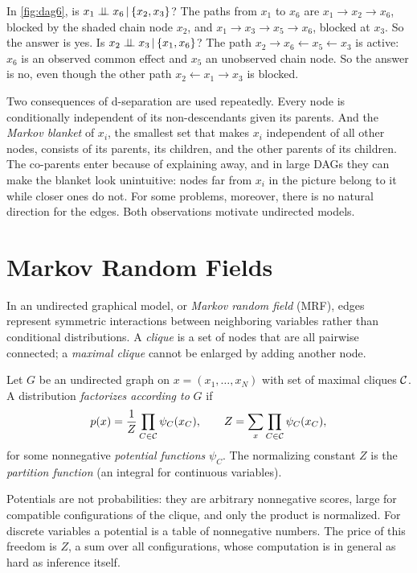 In \cref{fig:dag6}, is $x_1\perp\!\!\!\perp x_6\,|\,\{x_2,x_3\}$? The paths from $x_1$ to $x_6$ are $x_1\to x_2\to x_6$, blocked by the shaded chain node $x_2$, and $x_1\to x_3\to x_5\to x_6$, blocked at $x_3$. So the answer is yes. Is $x_2\perp\!\!\!\perp x_3\,|\,\{x_1,x_6\}$? The path $x_2\to x_6\leftarrow x_5\leftarrow x_3$ is active: $x_6$ is an observed common effect and $x_5$ an unobserved chain node. So the answer is no, even though the other path $x_2\leftarrow x_1\to x_3$ is blocked.

Two consequences of d-separation are used repeatedly. Every node is conditionally independent of its non-descendants given its parents. And the \emph{Markov blanket} of $x_i$, the smallest set that makes $x_i$ independent of all other nodes, consists of its parents, its children, and the other parents of its children. The co-parents enter because of explaining away, and in large DAGs they can make the blanket look unintuitive: nodes far from $x_i$ in the picture belong to it while closer ones do not. For some problems, moreover, there is no natural direction for the edges. Both observations motivate undirected models.

\section{Markov Random Fields}\label{sec:mrf}

In an undirected graphical model, or \emph{Markov random field} (MRF), edges represent symmetric interactions between neighboring variables rather than conditional distributions. A \emph{clique} is a set of nodes that are all pairwise connected; a \emph{maximal clique} cannot be enlarged by adding another node.

\begin{definition}\label{def:mrf}
Let $G$ be an undirected graph on $x=(x_1,\dots,x_N)$ with set of maximal cliques $\mathcal{C}$. A distribution \emph{factorizes according to} $G$ if
\[
p(x)=\frac1Z\prod_{C\in\mathcal{C}}\psi_C(x_C),\qquad Z=\sum_x\prod_{C\in\mathcal{C}}\psi_C(x_C),
\]
for some nonnegative \emph{potential functions} $\psi_C$. The normalizing constant $Z$ is the \emph{partition function} (an integral for continuous variables).
\end{definition}

Potentials are not probabilities: they are arbitrary nonnegative scores, large for compatible configurations of the clique, and only the product is normalized. For discrete variables a potential is a table of nonnegative numbers. The price of this freedom is $Z$, a sum over all configurations, whose computation is in general as hard as inference itself.

